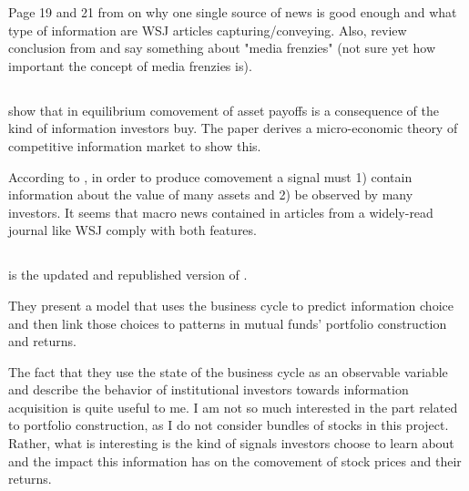 Page 19 and 21 from \textcite{Veldkamp2006} on why one single source of news is good enough and what type of information are WSJ articles capturing/conveying. 
Also, review conclusion from \textcite{Veldkamp2006} and say something about "media frenzies" (not sure yet how important the concept of media frenzies is).



\clearpage
\subsection{\textcite{Veldkamp2006a}}

\textcite{Veldkamp2006a} show that in equilibrium comovement of asset payoffs is a consequence of the kind of information investors buy. The paper derives a micro-economic theory of competitive information market to show this.


According to \textcite{Veldkamp2006a}, in order to produce comovement a signal must 1) contain information about the value of many assets and 2) be observed by many investors. It seems that macro news contained in articles from a widely-read journal like WSJ comply with both features.









\clearpage
\subsection{\textcite{Kacperczyk2016}}
\cite{Kacperczyk2016} is the updated and republished version of \cite{Kacperczyk2012}.

They present a model that uses the business cycle to predict information choice and then link those choices to patterns in mutual funds' portfolio construction and returns.

The fact that they use the state of the business cycle as an observable variable and describe the behavior of institutional investors towards information acquisition is quite useful to me. I am not so much interested in the part related to portfolio construction, as I do not consider bundles of stocks in this project. Rather, what is interesting is the kind of signals investors choose to learn about and the impact this information has on the comovement of stock prices and their returns.


